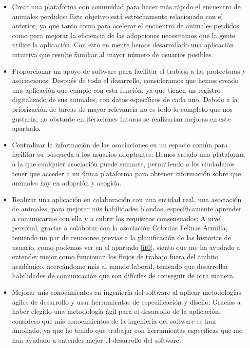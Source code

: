 \begin{itemize}
	\item Crear una plataforma con comunidad para hacer más rápido el encuentro de animales perdidos: Este objetivo está estrechamente relacionado con el anterior, ya que tanto como para acelerar el encuentro de animales perdidos como para mejorar la eficiencia de las adopciones necesitamos que la gente utilice la aplicación. Con esto en mente hemos desarrollado una aplicación intuitiva que resulte familiar al mayor número de usuarios posibles.
	
	\item Proporcionar un apoyo de software para facilitar el trabajo a las protectoras y asociaciones: Después de todo el desarrollo, consideramos que hemos creado una aplicación que cumple con esta función, ya que tienen un registro digitalizado de sus animales, con datos específicos de cada uno. Debido a la priorización de tareas de mayor relevancia no es todo lo completo que nos gustaría, no obstante en iteraciones futuras se realizarían mejoras en este apartado.
	
	\item Centralizar la información de las asociaciones en un espacio común para facilitar su búsqueda a los usuarios adoptantes: Hemos creado una plataforma a la que cualquier asociación puede sumarse, permitiendo a los ciudadanos tener que acceder a un única plataforma para obtener información sobre que animales hay en adopción y acogida.
	
	\item Realizar una aplicación en colaboración con una entidad real, una asociación de animales, para mejorar mis habilidades blandas, específicamente aprender a comunicarme con ella y a cubrir los requisitos consensuados: A nivel personal, gracias a colaborar con la asociación Colonias Felinas Armilla, teniendo un par de reuniones previas a la planificación de las historias de usuario, como podemos ver en el apartado \ref{it0}, siento que me ha ayudado a entender mejor como funcionan los flujos de trabajo fuera del ámbito académico, acercándome más al mundo laboral, teniendo que desarrollar habilidades de comunicación que son difíciles de conseguir de otra manera.
	
	\item Mejorar mis conocimientos en ingeniería del software al aplicar metodologías ágiles de desarrollo y usar herramientas de especificación y diseño: Gracias a haber elegido una metodología ágil para el desarrollo de la aplicación, considero que mis conocimientos de la ingeniería del software se han ampliado, ya que he tenido que trabajar con herramientas específicas que me han ayudado a entender mejor el desarrollo del software.
	\end{itemize}

